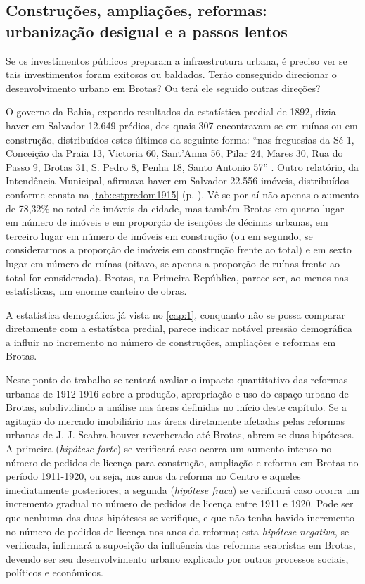 \subsection{Construções, ampliações, reformas: urbanização desigual e a passos lentos}\label{subsec:constrampliref}

Se os investimentos públicos preparam a infraestrutura urbana, é preciso ver se tais investimentos foram exitosos ou baldados. Terão conseguido direcionar o desenvolvimento urbano em Brotas? Ou terá ele seguido outras direções?

O governo da Bahia, expondo resultados da estatística predial de 1892, dizia haver em Salvador 12.649 prédios, dos quais 307 encontravam-se em ruínas ou em construção, distribuídos estes últimos da seguinte forma: ``nas freguesias da Sé 1, Conceição da Praia 13, Victoria 60, Sant'Anna 56, Pilar 24, Mares 30, Rua do Passo 9, Brotas 31, S. Pedro 8, Penha 18, Santo Antonio 57'' \cite[relatório da inspetoria de higiene, p.~6]{bahia_rpe_1893}. Outro relatório, da Intendência Municipal, afirmava haver em Salvador 22.556
imóveis, distribuídos conforme consta na \autoref{tab:estpredom1915} (p. \pageref{tab:estpredom1915}). Vê-se por aí não apenas o aumento de 78,32\% no total de imóveis da cidade, mas também Brotas em quarto lugar em número de imóveis e em proporção de isenções de décimas urbanas, em terceiro lugar em número de imóveis em construção (ou em segundo, se considerarmos a proporção de imóveis em construção frente ao total) e em sexto lugar em número de ruínas (oitavo, se apenas a proporção de ruínas frente ao total for considerada). Brotas, na Primeira República, parece ser, ao menos nas estatísticas, um enorme canteiro de obras.



A estatística demográfica já vista no \autoref{cap:1}, conquanto não se possa comparar diretamente com a estatístca predial, parece indicar notável pressão demográfica a influir no incremento no número de construções, ampliações e reformas em Brotas. 

Neste ponto do trabalho se tentará avaliar o impacto quantitativo das reformas urbanas de 1912-1916 sobre a produção, apropriação e uso do espaço urbano de Brotas, subdividindo a análise nas áreas definidas no início deste capítulo. Se a agitação do mercado imobiliário nas áreas diretamente afetadas pelas reformas urbanas de J. J. Seabra houver reverberado até Brotas, abrem-se duas hipóteses. A primeira (\textit{hipótese forte}) se verificará caso ocorra um aumento intenso no número de pedidos de licença para construção, ampliação e reforma em Brotas no período 1911-1920, ou seja, nos anos da reforma no Centro e aqueles imediatamente posteriores; a segunda (\textit{hipótese fraca}) se verificará caso ocorra um incremento gradual no número de pedidos de licença entre 1911 e 1920. Pode ser que nenhuma das duas hipóteses se verifique, e que não tenha havido incremento no número de pedidos de licença nos anos da reforma; esta \textit{hipótese negativa}, se verificada, infirmará a suposição da influência das reformas seabristas em Brotas, devendo ser seu desenvolvimento urbano explicado por outros processos sociais, políticos e econômicos.

